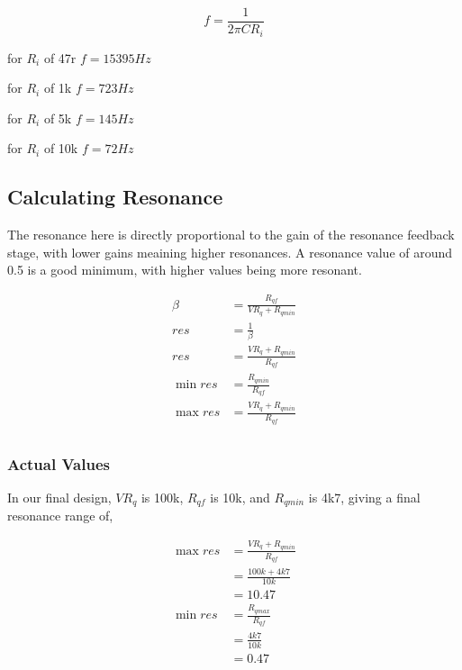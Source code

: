 \documentclass{article}
\begin{document}
\begin{equation}
  f = \frac{1}{2{\pi}CR_i}
\end{equation}

\begin{description}
  \item for $R_i$ of 47r  $f = 15395Hz$
  \item for $R_i$ of 1k   $f = 723Hz$
  \item for $R_i$ of 5k   $f = 145Hz$
  \item for $R_i$ of 10k  $f = 72Hz$
\end{description}

\subsection{Calculating Resonance}

The resonance here is directly proportional to the gain of the resonance feedback stage, with lower gains meaining higher resonances. A resonance value of around 0.5 is a good minimum, with higher values being more resonant.

\begin{equation*}
\begin{split}
  \beta & = \frac{R_{qf}}{VR_q + R_{qmin}} \\
  res   & = \frac{1}{\beta} \\
  res   & = \frac{VR_q + R_{qmin}}{R_{qf}} \\
  {\min res} & = \frac{R_{qmin}}{R_{qf}} \\
  {\max res} & = \frac{VR_q + R_{qmin}}{R_{qf}} \\
\end{split}
\end{equation*}


\subsubsection{Actual Values}

In our final design, $VR_{q}$ is 100k, $R_{qf}$ is 10k, and $R_{qmin}$ is 4k7, giving a final resonance range of,

\begin{equation*}
\begin{split}
  {\max res} & = \frac{VR_{q} + R_{qmin}}{R_{qf}} \\
             & = \frac{100k + 4k7}{10k} \\
             & = 10.47 \\
  {\min res} & = \frac{R_{qmax}}{R_{qf}} \\
             & = \frac{4k7}{10k} \\
             & = 0.47 \\
\end{split}
\end{equation*}
\end{document}
